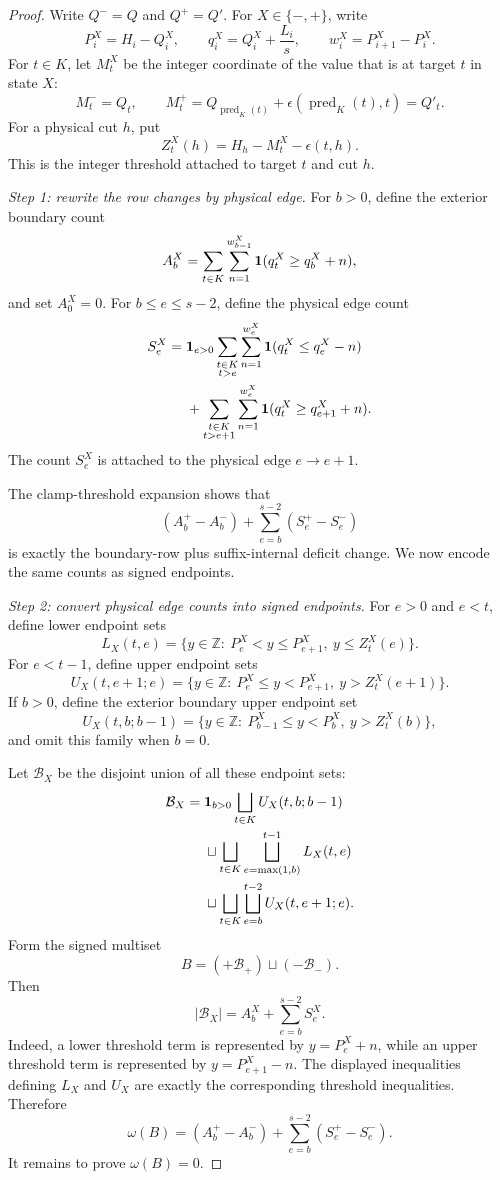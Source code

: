 \documentclass[10pt]{article}
\begin{document}
\begin{proof}
Write \(Q^-=Q\) and \(Q^+=Q'\).  For \(X\in\{-,+\}\), write
\[
  P_i^X=H_i-Q_i^X,\qquad
  q_i^X=Q_i^X+\frac{L_i}{s},\qquad
  w_i^X=P_{i+1}^X-P_i^X.
\]
For \(t\in K\), let \(M_t^X\) be the integer coordinate of the value that is
at target \(t\) in state \(X\):
\[
  M_t^-=Q_t,\qquad
  M_t^+=Q_{\operatorname{pred}_K(t)}
  +\epsilon(\operatorname{pred}_K(t),t)=Q'_t.
\]
For a physical cut \(h\), put
\[
  Z_t^X(h)=H_h-M_t^X-\epsilon(t,h).
\]
This is the integer threshold attached to target \(t\) and cut \(h\).

\smallskip
\noindent\emph{Step 1: rewrite the row changes by physical edge.}
For \(b>0\), define the exterior boundary count
\[
  A_b^X=
  \sum_{t\in K}
  \sum_{n=1}^{w_{b-1}^X}
  {\bf 1}(q_t^X\ge q_b^X+n),
\]
and set \(A_0^X=0\).  For \(b\le e\le s-2\), define the physical edge count
\[
\begin{aligned}
  S_e^X={}&
  {\bf 1}_{e>0}
  \sum_{\substack{t\in K\\ t>e}}
  \sum_{n=1}^{w_e^X}
  {\bf 1}(q_t^X\le q_e^X-n)\\
  &+
  \sum_{\substack{t\in K\\ t>e+1}}
  \sum_{n=1}^{w_e^X}
  {\bf 1}(q_t^X\ge q_{e+1}^X+n).
\end{aligned}
\]
The count \(S_e^X\) is attached to the physical edge \(e\to e+1\).

The clamp-threshold expansion shows that
\[
  (A_b^+-A_b^-)+\sum_{e=b}^{s-2}(S_e^+-S_e^-)
\]
is exactly the boundary-row plus suffix-internal deficit change.  We now
encode the same counts as signed endpoints.

\smallskip
\noindent\emph{Step 2: convert physical edge counts into signed endpoints.}
For \(e>0\) and \(e<t\), define lower endpoint sets
\[
  L_X(t,e)=
  \{y\in\mathbb Z:\ P_e^X<y\le P_{e+1}^X,\ y\le Z_t^X(e)\}.
\]
For \(e<t-1\), define upper endpoint sets
\[
  U_X(t,e+1;e)=
  \{y\in\mathbb Z:\ P_e^X\le y<P_{e+1}^X,\ y>Z_t^X(e+1)\}.
\]
If \(b>0\), define the exterior boundary upper endpoint set
\[
  U_X(t,b;b-1)=
  \{y\in\mathbb Z:\ P_{b-1}^X\le y<P_b^X,\ y>Z_t^X(b)\},
\]
and omit this family when \(b=0\).

Let \(\mathcal B_X\) be the disjoint union of all these endpoint sets:
\[
\begin{aligned}
  \mathcal B_X={}&
  {\bf 1}_{b>0}\bigsqcup_{t\in K}U_X(t,b;b-1)\\
  &\sqcup
  \bigsqcup_{t\in K}\bigsqcup_{e=\max(1,b)}^{t-1}L_X(t,e)\\
  &\sqcup
  \bigsqcup_{t\in K}\bigsqcup_{e=b}^{t-2}U_X(t,e+1;e).
\end{aligned}
\]
Form the signed multiset
\[
  B=(+\mathcal B_+)\sqcup(-\mathcal B_-).
\]
Then
\[
  |\mathcal B_X|=A_b^X+\sum_{e=b}^{s-2}S_e^X.
\]
Indeed, a lower threshold term is represented by \(y=P_e^X+n\), while an
upper threshold term is represented by \(y=P_{e+1}^X-n\).  The displayed
inequalities defining \(L_X\) and \(U_X\) are exactly the corresponding
threshold inequalities.  Therefore
\[
  \omega(B)=
  (A_b^+-A_b^-)+\sum_{e=b}^{s-2}(S_e^+-S_e^-).
  \tag{1}
\]
It remains to prove \(\omega(B)=0\).


\end{proof}
\end{document}
